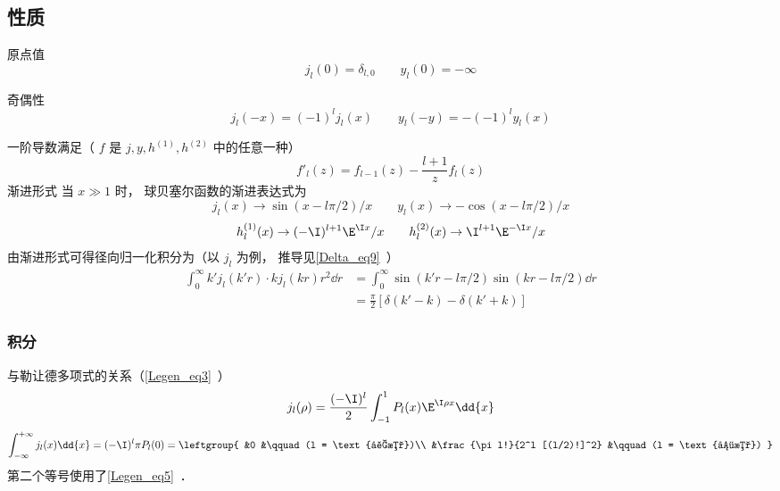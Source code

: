 \subsection{性质}
原点值
\begin{equation}
j_l(0) = \delta_{l,0} \qquad y_l(0) = -\infty
\end{equation}

奇偶性
\begin{equation}
j_l(-x) = (-1)^l j_l(x)
\qquad
y_l(-y) = -(-1)^l y_l(x)
\end{equation}

一阶导数满足（ $f$ 是 $j, y, h^{(1)}, h^{(2)}$ 中的任意一种）
\begin{equation}
f'_l(z) = f_{l-1}(z) - \frac{l+1}{z} f_l(z)
\end{equation}
渐进形式
当 $x \gg 1$ 时， 球贝塞尔函数的渐进表达式为
\begin{equation}\label{SphBsl_eq2}
j_l(x) \to \sin(x - l\pi /2)/x
\qquad
y_l(x) \to  - \cos(x - l\pi /2)/x
\end{equation}
\begin{equation}
h_l^{(1)}(x) \to ( -\I)^{l+1} \E^{\I x}/x
\qquad
h_l^{(2)}(x) \to \I^{l + 1} \E^{-\I x}/x
\end{equation}
由渐进形式可得径向归一化积分为（以 $j_l$ 为例， 推导见\autoref{Delta_eq9}~）
\begin{equation}
\begin{aligned}
\int_0^\infty k'j_l(k'r) \cdot kj_l(kr) r^2 \dd{r} &= \int_0^\infty \sin(k'r - l\pi/2)\sin(kr - l\pi/2) \dd{r}\\
& = \frac{\pi}{2}[\delta(k'-k) - \delta(k'+k)]
\end{aligned}
\end{equation}

\subsubsection{积分}
与勒让德多项式的关系（\autoref{Legen_eq3}~）
\begin{equation}
j_l(\rho) = \frac{(-\I)^l}{2} \int_{-1}^1 P_l(x) \E^{\I \rho x} \dd{x}
\end{equation}
\begin{equation}
\int_{-\infty}^{+\infty} j_l(x) \dd{x} = (-\I)^l \pi P_l(0)
= \leftgroup{
&0 &\qquad (l = \text{奇数})\\
&\frac{\pi l!}{2^l [(l/2)!]^2} &\qquad (l = \text{偶数})
}
\end{equation}
第二个等号使用了\autoref{Legen_eq5}~．

